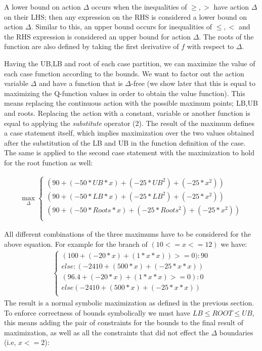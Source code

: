 \documentclass[letterpaper]{article}
\begin{document}
A lower bound on action $\Delta$ occurs when the inequalities of $\geq ,>$ have action $\Delta$ on their LHS; then any expression on the RHS is considered a lower bound on action $\Delta$. Similar to this, an upper bound occurs for inequalities of $\leq , <$ and the RHS expression is considered an upper bound for action $\Delta$. 
The roots of the function are also defined by taking the first derivative of $f$ with respect to $\Delta$.

Having the UB,LB and root of each case partition, we can maximize the value of each case function according to the bounds. We want to factor out the action variable $\Delta$ and have a function that is $\Delta$-free (we show later that this is equal to maximizing the Q-function values in order to obtain the value function). This means replacing the continuous action with the possible maximum points; LB,UB and roots. Replacing the action with a constant, variable or another function is equal to applying the \emph{substitute} operator (2). The result of the maximum defines a case statement itself, which implies maximization over the two values obtained after the substitution of the LB and UB in the function definition of the case. The same is applied to the second case statement with the maximization to hold for the root function as well: 

\begin{align*}
\max_{\Delta}
\begin{cases}
(90 + (-50 * UB * x) + (-25 * UB ^2) + (-25 * x^2)) \\ 
(90 + (-50 * LB * x) + (-25 * LB ^2) + (-25 * x^2)) \\ 
(90 + (-50 * Roots * x) + (-25 * Roots ^2) + (-25 * x^2))\\ 
  \end{cases}
\end{align*}

All different combinations of the three maximums have to be considered for the above equation. For example for the branch of $(10 <=x <= 12)$ we have:
\begin{align*}
\begin{cases}
(100 + (-20 * x) + (1 * x * x)) >= 0) : 90\\
else : (-2410 + (500 * x) + (-25 * x * x))\\
( 96.4 + (-20 * x) + (1 * x * x)>= 0): 0\\
else ( -2410 + (500 * x) + (-25 * x * x))\\
  \end{cases}
\end{align*}
The result is a normal symbolic maximization as defined in the previous section. 
To enforce correctness of bounds symbolically we must have $LB \leq ROOT \leq UB$, this means adding the pair of constraints for the bounds to the final result of maximization, as well as all the constraints that did not effect the $\Delta$ boundaries (i.e, $x<=2$):
\end{document}
